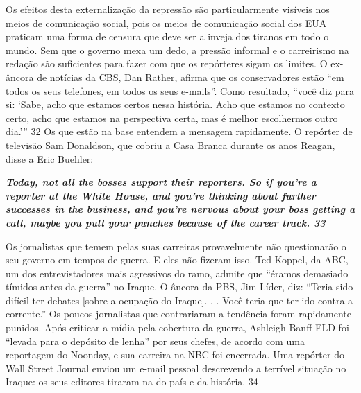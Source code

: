  
\par
 
Os efeitos desta externalização da repressão são particularmente visíveis nos meios de comunicação social, pois os meios de comunicação social dos EUA praticam uma forma de censura que deve ser a inveja dos tiranos em todo o mundo. Sem que o governo mexa um dedo, a pressão informal e o carreirismo na redação são suficientes para fazer com que os repórteres sigam os limites. O ex-âncora de notícias da CBS, Dan Rather, afirma que os conservadores estão “em todos os seus telefones, em todos os seus e-mails”. Como resultado, “você diz para si: ‘Sabe, acho que estamos certos nessa história. Acho que estamos no contexto certo, acho que estamos na perspectiva certa, mas é melhor escolhermos outro dia.’”
 {\color{blue} 32}  
Os que estão na base entendem a mensagem rapidamente. O repórter de televisão Sam Donaldson, que cobriu a Casa Branca durante os anos Reagan, disse a Eric Buehler:
 
\par
 

 \textbf{\textit{Today, not all the bosses support their reporters. So if you’re a reporter at the White House, and you’re thinking about further successes in the business, and you’re nervous about your boss getting a call, maybe you pull your punches because of the career track. {{\color{blue} 33} } } }  
 
 
\par
 
Os jornalistas que temem pelas suas carreiras provavelmente não questionarão o seu governo em tempos de guerra. E eles não fizeram isso. Ted Koppel, da ABC, um dos entrevistadores mais agressivos do ramo, admite que “éramos demasiado tímidos antes da guerra” no Iraque. O âncora da PBS, Jim Líder, diz: “Teria sido difícil ter debates [sobre a ocupação do Iraque]. . . Você teria que ter ido contra a corrente.” Os poucos jornalistas que contrariaram a tendência foram rapidamente punidos. Após criticar a mídia pela cobertura da guerra, Ashleigh Banff ELD foi “levada para o depósito de lenha” por seus chefes, de acordo com uma reportagem do Noonday, e sua carreira na NBC foi encerrada. Uma repórter do Wall Street Journal enviou um e-mail pessoal descrevendo a terrível situação no Iraque: os seus editores tiraram-na do país e da história.
 {\color{blue} 34}  

 
\par
 
